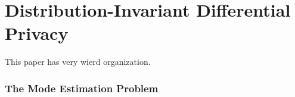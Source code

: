 
\chapter{Distribution-Invariant Differential Privacy}

This paper has very wierd organization.







\subsection{The Mode Estimation Problem}

